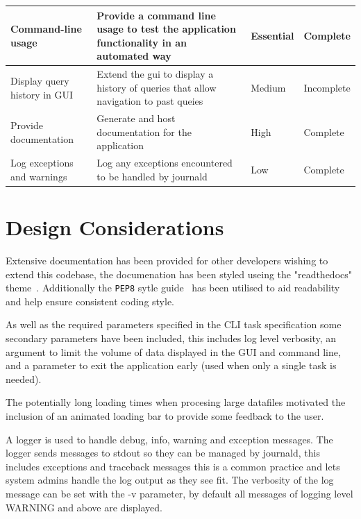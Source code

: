 \documentclass[11pt]{article}
\newcommand{\code}[1]{\colorbox{light-gray}{\texttt{#1}}}
\begin{document}
\begin{center}
\begin{longtable}{|p{3cm}|p{7cm}|l|p{2cm}|}
        \hline
        Command-line usage & Provide a command line usage to test the application functionality in an automated way & \textbf{Essential} & Complete \\
        \hline
        Display query history in GUI & Extend the gui to display a history of queries that allow navigation to past queies & Medium & Incomplete \\
        \hline
        Provide documentation & Generate and host documentation for the application & High & Complete \\ 
        \hline
        Log exceptions and warnings & Log any exceptions encountered to be handled by journald & Low & Complete \\
        \hline

    \end{longtable}
\end{center}


\section{Design Considerations}

Extensive documentation has been provided for other developers wishing to extend this codebase, the documenation has been styled useing the "readthedocs" theme~\autocite{HomeReadDocs}. Additionally the \code{PEP8} sytle guide~\autocite{PEPStyleGuide} has been utilised to aid readability and help ensure consistent coding style. 

As well as the required parameters specified in the CLI task specification some secondary parameters have been included, this includes log level verbosity, an argument to limit the volume of data displayed in the GUI and command line, and a parameter to exit the application early (used when only a single task is needed).

The potentially long loading times when procesing large datafiles motivated the inclusion of an animated loading bar to provide some feedback to the user.

A logger is used to handle debug, info, warning and exception messages. The logger sends messages to stdout so they can be managed by journald, this includes exceptions and traceback messages this is a common practice and lets system admins handle the log output as they see fit. The verbosity of the log message can be set with the -v parameter, by default all messages of logging level WARNING and above are displayed.
\end{document}
